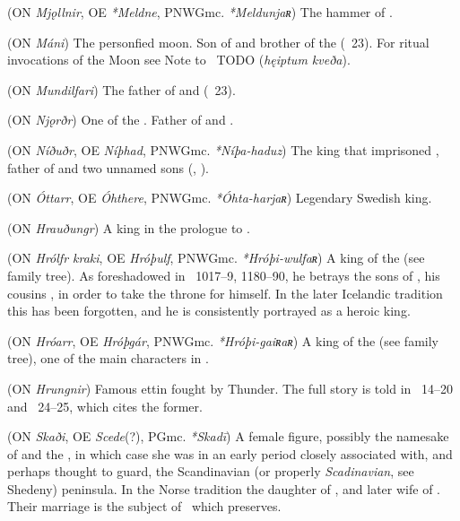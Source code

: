 \begin{itemize}
 (ON \emph{Mjǫllnir}, OE \emph{*Meldne}, PNWGmc. \emph{*Meldunjaʀ})
  The hammer of .

 (ON \emph{Máni})
  The personfied moon.  Son of  and brother of the  (\Vafthrudnismal\ 23).  For ritual invocations of the Moon see Note to \Havamal\ TODO (\emph{hęiptum kveða}).

 (ON \emph{Mundilfari})
  The father of  and  (\Vafthrudnismal\ 23).

 (ON \emph{Njǫrðr})
  One of the . Father of  and .

 (ON \emph{Níðuðr}, OE \emph{Níþhad}, PNWGmc. \emph{*Níþa-haduz})
  The king that imprisoned , father of  and two unnamed sons (\Volundarkvida, \Deor).

 (ON \emph{Óttarr}, OE \emph{Óhthere}, PNWGmc. \emph{*Óhta-harjaʀ})
  Legendary Swedish king.

 (ON \emph{Hrauðungr})
  A king in the prologue to \Grimnismal.

 (ON \emph{Hrólfr kraki}, OE \emph{Hróþulf}, PNWGmc. \emph{*Hróþi-wulfaʀ})
  A king of the  (see family tree). As foreshadowed in \Beowulf\ 1017–9, 1180–90, he betrays the sons of , his cousins , in order to take the throne for himself. In the later Icelandic tradition this has been forgotten, and he is consistently portrayed as a heroic king.

 (ON \emph{Hróarr}, OE \emph{Hróþgár}, PNWGmc. \emph{*Hróþi-gaiʀaʀ})
  A king of the  (see family tree), one of the main characters in \Beowulf.

 (ON \emph{Hrungnir})
  Famous ettin fought by Thunder.  The full story is told in \Haustlong\ 14–20 and \Skaldskaparmal\ 24–25, which cites the former.

 (ON \emph{Skaði}, OE \emph{Scede}(?), PGmc. \emph{*Skadī})
  A female figure, possibly the namesake of  and the , in which case she was in an early period closely associated with, and perhaps thought to guard, the Scandinavian (or properly \emph{Scadinavian}, see Shedeny) peninsula.
  In the Norse tradition the daughter of , and later wife of .  Their marriage is the subject of \Gylfaginning\ which preserves.


\end{itemize}

